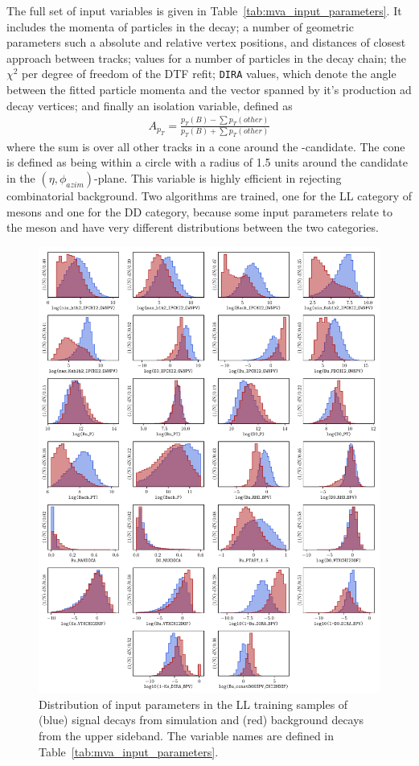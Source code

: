 


The full set of input variables is given in Table~\ref{tab:mva_input_parameters}. It includes the momenta of particles in the decay; a number of geometric parameters such a absolute and relative vertex positions, and distances of closest approach between tracks; \ipchisq values for a number of particles in the decay chain; the $\chi^2$ per degree of freedom of the DTF refit; \texttt{DIRA} values, which denote the angle between the fitted particle momenta and the vector spanned by it's production ad decay vertices; and finally an isolation variable, defined as
\begin{align}
    A_{p_T} = \frac{p_T(B)-\sum p_T(other)}{p_T(B)+\sum p_T(other)}
\end{align}
where the sum is over all other tracks in a cone around the \B-candidate. The cone is defined as being within a circle with a radius of 1.5 units around the \B candidate in the $(\eta, \phi_{azim})$-plane. This variable is highly efficient in rejecting combinatorial background.
Two algorithms are trained, one for the LL category of \KS mesons and one for the DD category, because some input parameters relate to the \KS meson and have very different distributions between the two categories. 


\begin{figure}[p!]
    \centering
    \includegraphics[width=0.95\columnwidth]{figures/analysis/input_param_LL.pdf}
    \caption{Distribution of input parameters in the LL training samples of (blue) signal decays from simulation and (red) background decays from the upper \B sideband. The variable names are defined in Table~\ref{tab:mva_input_parameters}.}
    \label{fig:input_variables_LL}
\end{figure}

